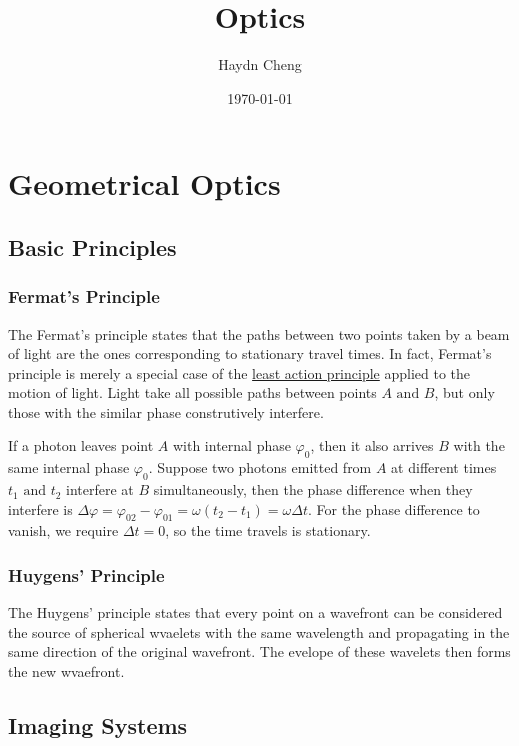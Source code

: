 \documentclass[english,a4paper,12pt]{report}
\title{Optics}
\author{Haydn Cheng}
\date{\today}
\begin{document}
\maketitle
\tableofcontents
    
\chapter{Geometrical Optics}

\section{Basic Principles}

\subsection{Fermat's Principle}

The Fermat's principle states that the paths between two points taken by a beam of light are the ones corresponding to stationary travel times. In fact, Fermat's principle is merely a special case of the \href{https:////www.youtube.com//watch?v=Q10_srZ-pbs}{least action principle} applied to the motion of light. Light take all possible paths between points \(A \text { and } B\), but only those with the similar phase construtively interfere.

If a photon leaves point \(A\) with internal phase \(\varphi _{0} \), then it also arrives \(B\) with the same internal phase \(\varphi _{0} \). Suppose two photons emitted from \(A\) at different times \(t_1 \text { and } t_2 \) interfere at \(B\) simultaneously, then the phase difference when they interfere is \(\Delta \varphi = \varphi _{02}- \varphi _{01}  = \omega (t_2 -t_1 ) = \omega \Delta t\). For the phase difference to vanish, we require \(\Delta t = 0\), so the time travels is stationary.

\subsection{Huygens' Principle}

The Huygens' principle states that every point on a wavefront can be considered the source of spherical wvaelets with the same wavelength and propagating in the same direction of the original wavefront. The evelope of these wavelets then forms the new wvaefront. 

\section{Imaging Systems}
\end{document}
